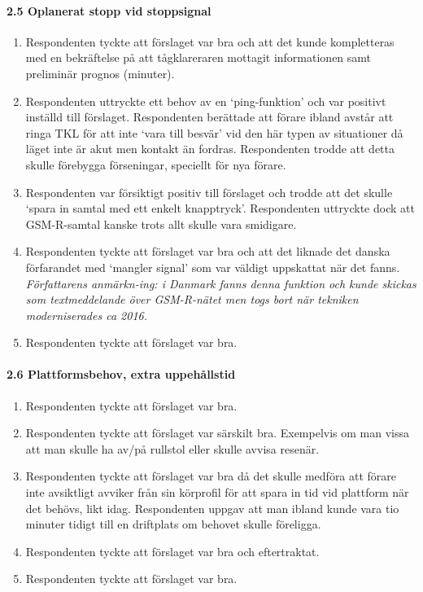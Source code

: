 \paragraph{2.5 Oplanerat stopp vid stoppsignal}
\begin{enumerate}
    \item Respondenten tyckte att förslaget var bra och att det kunde kompletteras med en bekräftelse på att tågklareraren mottagit informationen samt preliminär prognos (minuter).
    \item Respondenten uttryckte ett behov av en \lq{}ping-funktion\rq{} och var positivt inställd till förslaget.
    Respondenten berättade att förare ibland avstår att ringa TKL för att inte \lq{}vara till besvär\rq{} vid den här typen av situationer då läget inte är akut men kontakt än fordras.
    Respondenten trodde att detta skulle förebygga förseningar, speciellt för nya förare.
    \item Respondenten var försiktigt positiv till förslaget och trodde att det skulle \lq{}spara in samtal med ett enkelt knapptryck\rq{}.
    Respondenten uttryckte dock att GSM-R-samtal kanske trots allt skulle vara smidigare.
    \item Respondenten tyckte att förslaget var bra och att det liknade det danska förfarandet med \lq{}mangler signal\rq{} som var väldigt uppskattat när det fanns.
    \emph{Författarens anmärkn-ing: i Danmark fanns denna funktion och kunde skickas som textmeddelande över GSM-R-nätet men togs bort när tekniken moderniserades ca 2016.}
    \item Respondenten tyckte att förslaget var bra.
\end{enumerate}
\hspace{-12pt}
\paragraph{2.6 Plattformsbehov, extra uppehållstid}
\begin{enumerate}
    \item Respondenten tyckte att förslaget var bra.
    \item Respondenten tyckte att förslaget var särskilt bra.
    Exempelvis om man vissa att man skulle ha av/på rullstol eller skulle avvisa resenär.
    \item Respondenten tyckte att förslaget var bra då det skulle medföra att förare inte avsiktligt avviker från sin körprofil för att spara in tid vid plattform när det behövs, likt idag.
    Respondenten uppgav att man ibland kunde vara tio minuter tidigt till en driftplats om behovet skulle föreligga.
    \item Respondenten tyckte att förslaget var bra och eftertraktat.
    \item Respondenten tyckte att förslaget var bra.
\end{enumerate}
\hspace{-12pt}
